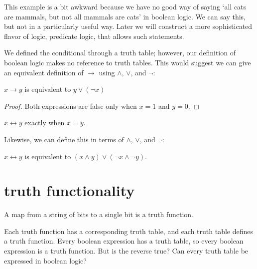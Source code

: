 \documentclass{scrbook}
\renewcommand{\implies}{\to}
\renewcommand{\iff}{\leftrightarrow}
\begin{document}
This example is a bit awkward because we have no good way of saying `all cats are mammals, but not all mammals are cats' in boolean logic. We can say this, but not in a particularly useful way. Later we will construct a more sophisticated flavor of logic, predicate logic, that allows such statements. 

We defined the conditional through a truth table; however, our definition of boolean logic makes no reference to truth tables. This would suggest we can give an equivalent definition of $\implies$ using $\wedge$, $\vee$, and $\neg$:
\begin{theorem}
  $x\implies y$ is equivalent to $y \vee (\neg x)$
\end{theorem}
\begin{proof}
  Both expressions are false only when $x=1$ and $y=0$. 
\end{proof}

\begin{defn}[logical equivalence $\iff$]
  $x\iff y$ exactly when $x = y$. 
\end{defn}
Likewise, we can define this in terms of $\wedge$, $\vee$, and $\neg$:
\begin{theorem}
  $x\iff y$ is equivalent to $(x \wedge y) \vee (\neg x \wedge \neg y)$. 
\end{theorem}
\section[Truth Functionality]{truth functionality}
\begin{defn}
  A map from a string of bits to a single bit is a truth function. 
\end{defn}
Each truth function has a corresponding truth table, and each truth table defines a truth function. Every boolean expression has a truth table, so every boolean expression is a truth function. But is the reverse true? Can every truth table be expressed in boolean logic? 
\end{document}
